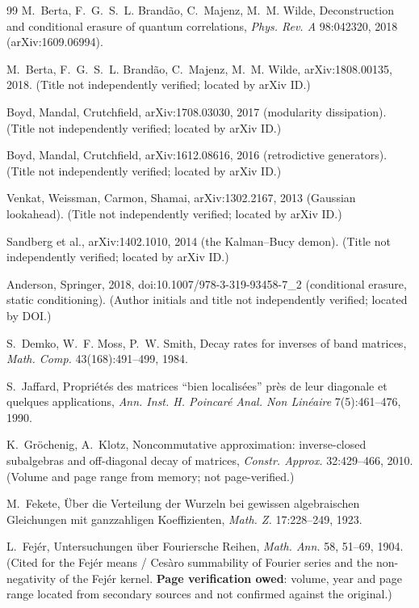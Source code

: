 \documentclass[11pt]{article}
\theoremstyle{definition}
\theoremstyle{remark}
\begin{document}
\begin{thebibliography}{99}
 M.~Berta, F.~G.~S.~L. Brand\~ao, C.~Majenz,
M.~M. Wilde, Deconstruction and conditional erasure of quantum
correlations, \emph{Phys. Rev. A} 98:042320, 2018
(arXiv:1609.06994).

 M.~Berta, F.~G.~S.~L. Brand\~ao, C.~Majenz,
M.~M. Wilde, arXiv:1808.00135, 2018. (Title not independently
verified; located by arXiv ID.)

 Boyd, Mandal, Crutchfield, arXiv:1708.03030,
2017 (modularity dissipation). (Title not independently verified;
located by arXiv ID.)

 Boyd, Mandal, Crutchfield, arXiv:1612.08616,
2016 (retrodictive generators). (Title not independently verified;
located by arXiv ID.)

 Venkat, Weissman, Carmon, Shamai,
arXiv:1302.2167, 2013 (Gaussian lookahead). (Title not independently
verified; located by arXiv ID.)

 Sandberg et al., arXiv:1402.1010, 2014
(the Kalman--Bucy demon). (Title not independently verified;
located by arXiv ID.)

 Anderson, Springer, 2018,
doi:10.1007/978-3-319-93458-7\_2 (conditional erasure, static
conditioning). (Author initials and title not independently verified;
located by DOI.)

 S.~Demko, W.~F. Moss, P.~W. Smith, Decay rates
for inverses of band matrices, \emph{Math. Comp.} 43(168):491--499,
1984.

 S.~Jaffard, Propri\'et\'es des matrices
``bien localis\'ees'' pr\`es de leur diagonale et quelques
applications, \emph{Ann. Inst. H. Poincar\'e Anal. Non Lin\'eaire}
7(5):461--476, 1990.

 K.~Gr\"ochenig, A.~Klotz, Noncommutative
approximation: inverse-closed subalgebras and off-diagonal decay of
matrices, \emph{Constr. Approx.} 32:429--466, 2010. (Volume and page
range from memory; not page-verified.)

 M.~Fekete, \"Uber die Verteilung der Wurzeln
bei gewissen algebraischen Gleichungen mit ganzzahligen
Koeffizienten, \emph{Math. Z.} 17:228--249, 1923.

 L.~Fej\'er, Untersuchungen \"uber Fouriersche Reihen,
\emph{Math. Ann.} 58, 51--69, 1904. (Cited for the Fej\'er means / Ces\`aro
summability of Fourier series and the non-negativity of the Fej\'er kernel.
\textbf{Page verification owed}: volume, year and page range located from
secondary sources and not confirmed against the original.)


\end{thebibliography}
\end{document}
